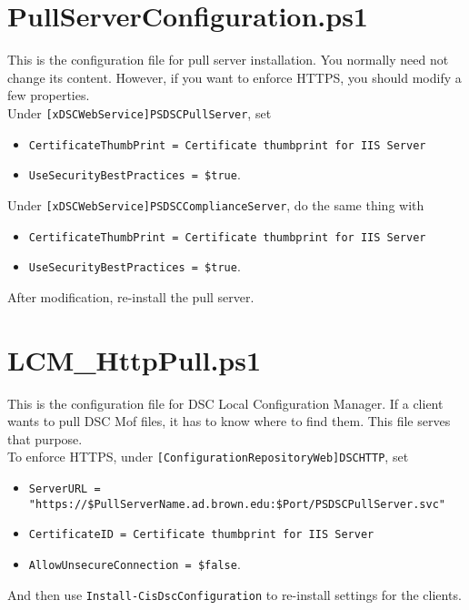   \section{PullServerConfiguration.ps1}
    This is the configuration file for pull server installation. You normally need not change its content. However, if you want to enforce HTTPS, you should modify a few properties.\\
    Under \verb^[xDSCWebService]PSDSCPullServer^, set
    \begin{itemize}
      \item \verb^CertificateThumbPrint = Certificate thumbprint for IIS Server^
      \item \verb^UseSecurityBestPractices = $true^.
    \end{itemize}
    Under \verb^[xDSCWebService]PSDSCComplianceServer^, do the same thing with
    \begin{itemize}
      \item \verb^CertificateThumbPrint = Certificate thumbprint for IIS Server^
      \item \verb^UseSecurityBestPractices = $true^.
    \end{itemize}
    After modification, re-install the pull server.

  \section{LCM\_HttpPull.ps1}
    This is the configuration file for DSC Local Configuration Manager. If a client wants to pull DSC Mof files, it has to know where to find them. This file serves that purpose.\\
    To enforce HTTPS, under \verb^[ConfigurationRepositoryWeb]DSCHTTP^, set
    \begin{itemize}
      \item \verb^ServerURL =^\\
      \verb^"https://$PullServerName.ad.brown.edu:$Port/PSDSCPullServer.svc"^
      \item \verb^CertificateID = Certificate thumbprint for IIS Server^
      \item \verb^AllowUnsecureConnection = $false^.
    \end{itemize}
    And then use \verb^Install-CisDscConfiguration^ to re-install settings for the clients.
